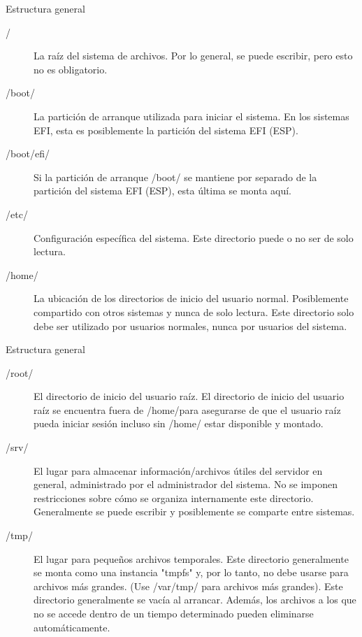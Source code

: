 \begin{frame}[c]{Estructura general}
  \begin{description}
    \item [/] La raíz del sistema de archivos. Por lo general, se puede
			escribir, pero esto no es obligatorio.
    \pausa
		\item [/boot/] La partición de arranque utilizada para iniciar el sistema.
			En los sistemas EFI, esta es posiblemente la partición del sistema EFI
			(ESP).
    \pausa
		\item [/boot/efi/] Si la partición de arranque /boot/ se mantiene
			por separado de la partición del sistema EFI (ESP), esta última se monta
			aquí.
    \pausa
		\item [/etc/] Configuración específica del sistema. Este directorio puede
			o no ser de solo lectura.
    \pausa
		\item [/home/] La ubicación de los directorios de inicio del usuario
			normal. Posiblemente compartido con otros sistemas y nunca de solo
			lectura. Este directorio solo debe ser utilizado por usuarios normales,
			nunca por usuarios del sistema.
  \end{description}
\end{frame}

\begin{frame}[c]{Estructura general}
  \begin{description}
    \item [/root/] El directorio de inicio del usuario raíz. El directorio de
			inicio del usuario raíz se encuentra fuera de /home/para asegurarse de
			que el usuario raíz pueda iniciar sesión incluso sin /home/ estar
			disponible y montado.
    \pausa
    \item [/srv/] El lugar para almacenar información/archivos útiles del
			servidor en general, administrado por el administrador del sistema.
			No se imponen restricciones sobre cómo se organiza internamente este
			directorio. Generalmente se puede escribir y posiblemente se comparte
			entre sistemas.
    \pausa
    \item [/tmp/] El lugar para pequeños archivos temporales. Este directorio
			generalmente se monta como una instancia "tmpfs" y, por lo tanto, no
			debe usarse para archivos más grandes. (Use /var/tmp/ para archivos más
			grandes). Este directorio generalmente se vacía al arrancar. Además, los
			archivos a los que no se accede dentro de un tiempo determinado pueden
			eliminarse automáticamente.
  \end{description}
\end{frame}

